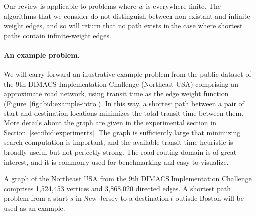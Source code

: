 Our review is applicable to problems where $w$ is everywhere finite.
The algorithms that we consider do not distinguish between non-existant
and infinite-weight edges,
and so will return that no path exists in the case where shortest
paths contain infinite-weight edges.

\paragraph{An example problem.}
We will carry forward an illustrative example problem from
the public dataset of the 9th DIMACS Implementation Challenge
\citep{demetrescuetal2006dimacs9}
(Northeast USA)
comprising an approximate road network,
using transit time as the edge weight function
(Figure~\ref{fig:ibid:example-intro}).
In this way,
a shortest path between a pair of start and destination locations
minimizes the total transit time between them.
More details about the graph are given in the experimental section
in Section~\ref{sec:ibid:experiments}.
The graph is sufficiently large that minimizing search computation
is important,
and the available transit time heuristic is broadly useful
but not perfectly strong.
The road routing domain is of great interest,
and it is commonly used for benchmarking and easy to visualize.

\begin{marginfigure}%
   \centering%
   \caption{A graph of the Northeast USA from the 9th DIMACS
      Implementation Challenge
      comprises 1,524,453 vertices and 3,868,020 directed edges.
      A shortest path problem from a start $s$ in New Jersey
      to a destination $t$ outisde Boston
      will be used as an example.}%
   \label{fig:ibid:example-intro}%
\end{marginfigure}


